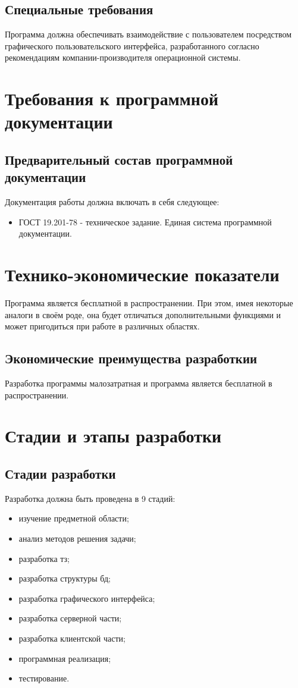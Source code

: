 \documentclass[14pt]{extarticle}
\begin{document}
\subsection {Специальные требования}
Программа должна обеспечивать взаимодействие с пользователем посредством графического пользовательского интерфейса, разработанного согласно рекомендациям компании-производителя операционной системы.

\newpage

\section{Требования к программной документации}
\subsection {Предварительный состав программной документации}
Документация работы должна включать в себя следующее:
\begin{itemize} 
    \item ГОСТ 19.201-78 - техническое задание. Единая система программной документации.
\end{itemize}

\newpage

\section{Технико-экономические показатели}
Программа является бесплатной в распространении. При этом, имея некоторые аналоги в своём роде, она будет отличаться дополнительными функциями и может пригодиться при работе в различных областях.
\subsection {Экономические преимущества разработкии}
Разработка программы малозатратная и программа является бесплатной в распространении.

\newpage

\section{Стадии и этапы разработки}
\subsection {Стадии разработки}
Разработка должна быть проведена в 9 стадий:
\begin{itemize} 
    \item изучение предметной области;
    \item анализ методов решения задачи;
    \item разработка тз;
    \item разработка структуры бд;
    \item разработка графического интерфейса;
    \item разработка серверной части;
    \item разработка клиентской части;
    \item программная реализация;
    \item тестирование.
\end{itemize}
\end{document}
